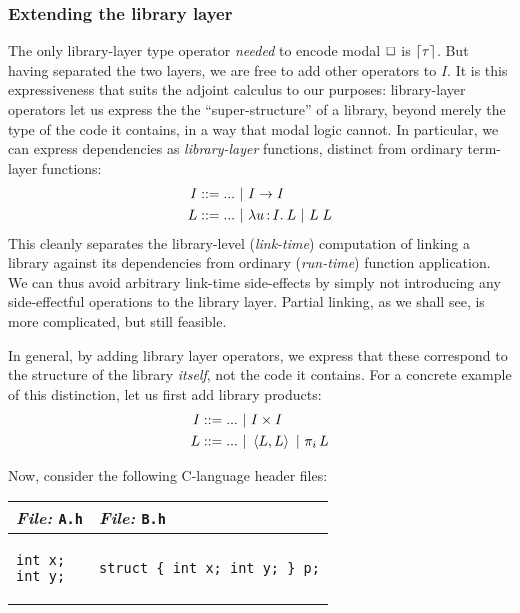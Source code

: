 \documentclass[11pt]{article}
\begin{document}


\subsubsection{Extending the library layer}

The only library-layer type operator \emph{needed} to encode modal $\Box$ is
$\lceil{\tau}\rceil$. But having separated the two layers, we are free to add other
operators to $I$. It is this expressiveness that suits the adjoint calculus to
our purposes: library-layer operators let us express the the ``super-structure''
of a library, beyond merely the type of the code it contains, in a way that
modal logic cannot. In particular, we can express dependencies as
\emph{library-layer} functions, distinct from ordinary term-layer functions:
\begin{align*}
  I &::= ... ~|~ I \to I\\
  L &::= ... ~|~ \lambda u \mathop{:} I .\: L ~|~ L \; L
\end{align*}
This cleanly separates the library-level (\emph{link-time}) computation of
linking a library against its dependencies from ordinary (\emph{run-time})
function application. We can thus avoid arbitrary link-time side-effects by
simply not introducing any side-effectful operations to the library layer.
Partial linking, as we shall see, is more complicated, but still feasible.

In general, by adding library layer operators, we express that these correspond
to the structure of the library \emph{itself}, not the code it contains. For a
concrete example of this distinction, let us first add library products:
\begin{align*}
  I &::= ... ~|~ I \times I\\
  L &::= ... ~|~ \left\langle L, L\right\rangle ~|~ \pi_{i} \, L
\end{align*}

Now, consider the following C-language header files:
\begin{center}
  \begin{tabular}{l|l}
    \emph{File:} \texttt{A.h} & \emph{File:} \texttt{B.h}\\\hline
    \begin{minipage}[t]{0.35\linewidth}
\begin{verbatim}
int x;
int y;
\end{verbatim}
    \end{minipage} &
    \begin{minipage}[t]{0.35\linewidth}
\begin{verbatim}
struct { int x; int y; } p;
\end{verbatim}
    \end{minipage}
  \end{tabular}
\end{center}
\end{document}
